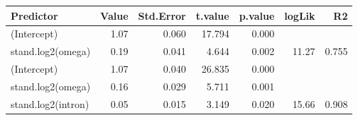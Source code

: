 \begin{table}[ht]
\centering
\begin{tabular}{lrrrrrr}
  \hline
Predictor & Value & Std.Error & t.value & p.value & logLik & R2 \\ 
  \hline
(Intercept) & 1.07 & 0.060 & 17.794 & 0.000 &  &  \\ 
  stand.log2(omega) & 0.19 & 0.041 & 4.644 & 0.002 & 11.27 & 0.755 \\ 
   \hline
(Intercept) & 1.07 & 0.040 & 26.835 & 0.000 &  &  \\ 
  stand.log2(omega) & 0.16 & 0.029 & 5.711 & 0.001 &  &  \\ 
  stand.log2(intron) & 0.05 & 0.015 & 3.149 & 0.020 & 15.66 & 0.908 \\ 
   \hline
\end{tabular}
\end{table}
